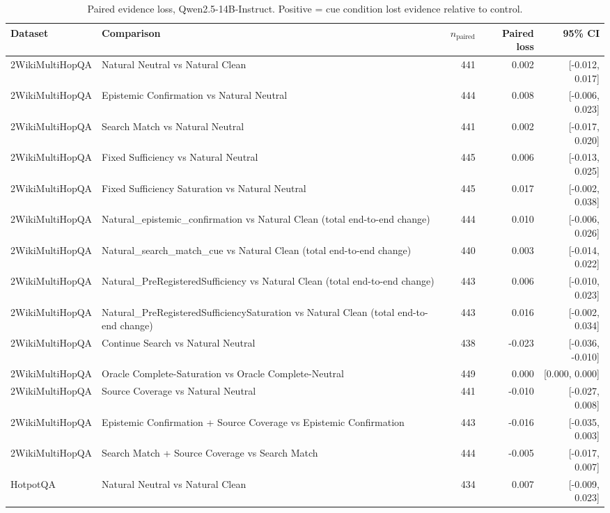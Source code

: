 \begin{table}[t]
\centering
\caption{Paired evidence loss, Qwen2.5-14B-Instruct. Positive = cue condition lost evidence relative to control.}
\begin{tabular}{llrrr}
\toprule
Dataset & Comparison & $n_{\text{paired}}$ & Paired loss & 95\% CI \\
\midrule
2WikiMultiHopQA & Natural Neutral vs Natural Clean & 441 & 0.002 & [-0.012, 0.017] \\
2WikiMultiHopQA & Epistemic Confirmation vs Natural Neutral & 444 & 0.008 & [-0.006, 0.023] \\
2WikiMultiHopQA & Search Match vs Natural Neutral & 441 & 0.002 & [-0.017, 0.020] \\
2WikiMultiHopQA & Fixed Sufficiency vs Natural Neutral & 445 & 0.006 & [-0.013, 0.025] \\
2WikiMultiHopQA & Fixed Sufficiency Saturation vs Natural Neutral & 445 & 0.017 & [-0.002, 0.038] \\
2WikiMultiHopQA & Natural\_epistemic\_confirmation vs Natural Clean (total end-to-end change) & 444 & 0.010 & [-0.006, 0.026] \\
2WikiMultiHopQA & Natural\_search\_match\_cue vs Natural Clean (total end-to-end change) & 440 & 0.003 & [-0.014, 0.022] \\
2WikiMultiHopQA & Natural\_PreRegisteredSufficiency vs Natural Clean (total end-to-end change) & 443 & 0.006 & [-0.010, 0.023] \\
2WikiMultiHopQA & Natural\_PreRegisteredSufficiencySaturation vs Natural Clean (total end-to-end change) & 443 & 0.016 & [-0.002, 0.034] \\
2WikiMultiHopQA & Continue Search vs Natural Neutral & 438 & -0.023 & [-0.036, -0.010] \\
2WikiMultiHopQA & Oracle Complete-Saturation vs Oracle Complete-Neutral & 449 & 0.000 & [0.000, 0.000] \\
2WikiMultiHopQA & Source Coverage vs Natural Neutral & 441 & -0.010 & [-0.027, 0.008] \\
2WikiMultiHopQA & Epistemic Confirmation + Source Coverage vs Epistemic Confirmation & 443 & -0.016 & [-0.035, 0.003] \\
2WikiMultiHopQA & Search Match + Source Coverage vs Search Match & 444 & -0.005 & [-0.017, 0.007] \\
HotpotQA & Natural Neutral vs Natural Clean & 434 & 0.007 & [-0.009, 0.023] \\

\end{tabular}
\end{table}
